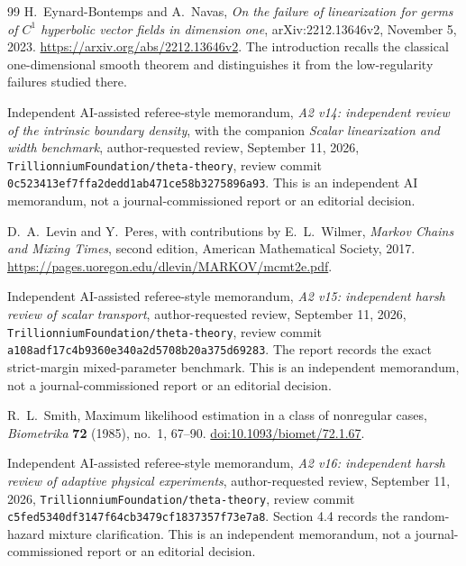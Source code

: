 \begin{thebibliography}{99}
H.~Eynard-Bontemps and A.~Navas, \emph{On the failure of linearization
for germs of $C^1$ hyperbolic vector fields in dimension one},
arXiv:2212.13646v2, November 5, 2023.
\url{https://arxiv.org/abs/2212.13646v2}.
The introduction recalls the classical one-dimensional smooth theorem
and distinguishes it from the low-regularity failures studied there.

Independent AI-assisted referee-style memorandum,
\emph{A2 v14: independent review of the intrinsic boundary density},
with the companion \emph{Scalar linearization and width benchmark},
author-requested review, September 11, 2026,
\texttt{TrillionniumFoundation/theta-theory},
review commit \texttt{0c523413ef7ffa2dedd1ab471ce58b3275896a93}.
This is an independent AI memorandum, not a journal-commissioned report
or an editorial decision.

D.~A.~Levin and Y.~Peres, with contributions by E.~L.~Wilmer,
\emph{Markov Chains and Mixing Times}, second edition,
American Mathematical Society, 2017.
\url{https://pages.uoregon.edu/dlevin/MARKOV/mcmt2e.pdf}.

Independent AI-assisted referee-style memorandum,
\emph{A2 v15: independent harsh review of scalar transport},
author-requested review, September 11, 2026,
\texttt{TrillionniumFoundation/theta-theory},
review commit \texttt{a108adf17c4b9360e340a2d5708b20a375d69283}.
The report records the exact strict-margin mixed-parameter benchmark.
This is an independent memorandum, not a journal-commissioned report
or an editorial decision.

R.~L.~Smith, Maximum likelihood estimation in a class of nonregular
cases, \emph{Biometrika} \textbf{72} (1985), no.~1, 67--90.
\href{https://doi.org/10.1093/biomet/72.1.67}{doi:10.1093/biomet/72.1.67}.

Independent AI-assisted referee-style memorandum,
\emph{A2 v16: independent harsh review of adaptive physical experiments},
author-requested review, September 11, 2026,
\texttt{TrillionniumFoundation/theta-theory},
review commit \texttt{c5fed5340df3147f64cb3479cf1837357f73e7a8}.
Section 4.4 records the random-hazard mixture clarification.
This is an independent memorandum, not a journal-commissioned report
or an editorial decision.

\end{thebibliography}
